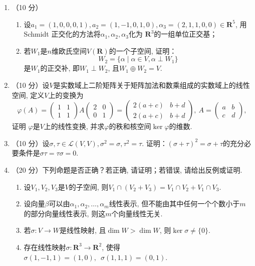 \begin{enumerate}
    \item （10 分）
        \begin{enumerate}
              \item 设\(a_1 = (1,0,0,0,1),a_2 = (1, - 1,0,1,0),\alpha_3 = (2,1,1,0,0) \in \mathbf{R}^{5}\), 用
                    Schmidt 正交化的方法将\(\alpha_1,\alpha_2,\alpha_3\)化为
                    \(\mathbf{R}^3\)的一组单位正交基；
              \item 若\(W_1\)是\(n\)维欧氏空间\(V( \mathbf{R} )\)的一个子空间, 证明：
                    \[W_2 = \{ \alpha \mid \alpha \in V,\alpha\perp W_1 \}\]
                    是\(W_1\)的正交补, 即\(W_1\perp W_2\), 且\(W_1 \oplus W_2 = V\).
          \end{enumerate}

    \item （10 分）设\(V\)是实数域上二阶矩阵关于矩阵加法和数乘组成的实数域上的线性空间, 定义\(V\)上的变换为
          \[\varphi(A) =
              \begin{pmatrix}
                  1 & 1 \\
                  1 & 1
              \end{pmatrix} A \begin{pmatrix}
                  2 & 0 \\
                  0 & 1
              \end{pmatrix} = \begin{pmatrix}
                  2(a + c) & b + d \\
                  2(a + c) & b + d
              \end{pmatrix},\ A = \begin{pmatrix}
                  a & b \\
                  c & d
              \end{pmatrix},\]
          证明 \(\varphi\)是\(V\)上的线性变换, 并求\(\varphi\)的秩和核空间\(\ker\varphi\)的维数.


    \item （10 分）设\(\sigma,\tau \in \mathcal{L}(V,V),\sigma^2 = \sigma,\tau^2 = \tau\). 证明：\((\sigma + \tau)^2 = \sigma + \tau\)的充分必要条件是\(\sigma\tau = \tau\sigma = 0\).

    \item （20 分）下列命题是否正确？若正确, 请证明；若错误, 请给出反例或证明.
          \begin{enumerate}
              \item 设\(V_1,V_2,V_3\)是\(V\)的子空间, 则\(V_1 \cap ( V_2 + V_3 ) = V_1 \cap V_2 + V_1 \cap V_3\).
              \item 设向量\(\beta\)可以由\(\alpha_1,\alpha_2,\ldots,\alpha_{m}\)线性表示, 但不能由其中任何一个个数小于\(m\)的部分向量线性表示, 则这\(m\)个向量线性无关.
              \item 若\(\sigma\colon V \to W\)是线性映射, 且\(\dim W > \dim W\), 则\(\ker\sigma \neq \{ 0 \}\).
              \item 存在线性映射\(\sigma\colon \mathbf{R}^3 \to \mathbf{R}^2\), 使得\(\sigma(1, - 1,1) = (1,0),\enspace \sigma(1,1,1) = (0,1)\).
          \end{enumerate}
\end{enumerate}

\clearpage

